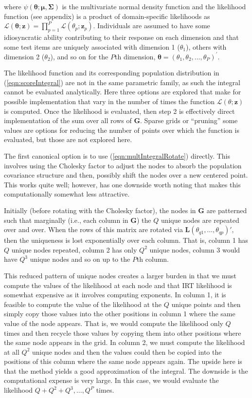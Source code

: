 \documentclass[12pt]{article}
\begin{document}
\noindent where $\psi(\boldsymbol{\theta};\boldsymbol{\mu},\boldsymbol{\Sigma})$ is the multivariate normal density function and the likelihood function (see appendix) is a product of domain-specific likelihoods as $\mathcal{L}(\boldsymbol{\theta};\boldsymbol{z}) = \prod^P_{p=1}\mathcal{L}(\theta_p;\bm{z}_p)$. Individuals are assumed to have some idiosyncratic ability contributing to their response on each dimension and that some test items are uniquely associated with dimension 1 ($\theta_1$), others with dimension 2 ($\theta_2$), and so on for the $P$th dimension, $\boldsymbol{\theta}\boldsymbol{=}(\theta_1, \theta_2,\dots ,\theta_P)^{'}$. 

The likelihood function and its corresponding population distribution in (\ref{eqn:scoreIntegral}) are not in the same parametric family, as such the integral cannot be evaluated analytically. Here three options are explored that make for possible implementation that vary in the number of times the function $\mathcal{L}(\theta;\bm{z})$ is computed. Once the likelihood is evaluated, then step 2 is effectively direct implementation of the sum over all rows of $\bm{G}$. Sparse grids or ``pruning'' some values are options for reducing the number of points over which the function is evaluated, but those are not explored here.

The first canonical option is to use (\ref{eqn:multIntegralRotate}) directly. This involves using the Cholesky factor to adjust the nodes to absorb the population covariance structure and then, possibly shift the nodes over a new centered point. This works quite well; however, has one downside worth noting that makes this computationally somewhat less attractive. 

Initially (before rotating with the Cholesky factor), the nodes in $\bm{G}$ are patterned such that marginally (i.e., each column in $\bm{G}$) the $Q$ unique nodes are repeated over and over. When the rows of this matrix are rotated via $\bm{L}(\theta_{q1}, \ldots, \theta_{qp})'$, then the uniqueness is lost exponentially over each column. That is, column 1 has $Q$ unique nodes repeated, column 2 has only $Q^2$ unique nodes, column 3 would have $Q^3$ unique nodes and so on up to the $P$th column. 

This reduced pattern of unique nodes creates a larger burden in that we must compute the values of the likelihood at each node and that IRT likelihood is somewhat expensive as it involves computing exponents. In column 1, it is feasible to compute the value of the likelihood at the $Q$ unique points and then simply copy those values into the other positions in column 1 where the same value of the node appears. That is, we would compute the likelihood only $Q$ times and then recycle those values by copying them into other positions where the same node appears in the grid. In column 2, we must compute the likelihood at all $Q^2$ unique nodes and then the values could then be copied into the positions of this column where the same node appears again. The upside here is that the method yields a good approximation of the integral. The downside is the computational expense is very large. In this case, we would evaluate the likelihood  $Q + Q^2 + Q^3, \ldots, Q^P$ times.
\end{document}
